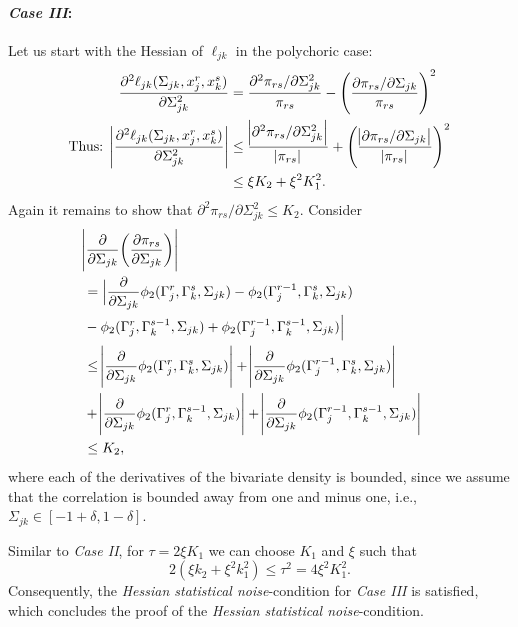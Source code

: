 \begin{condition}
    \paragraph{\textit{Case III}:} Let us start with the Hessian of \(\ell_{jk}\) in the polychoric case:
    \begin{equation}\label{hessian_case3}
        \begin{split}
            \frac{\partial^2 \ell_{jk}(\Sigma_{jk}, x_j^r,x_k^s)}{\partial \Sigma_{jk}^{2}} &= \frac{\partial^2 \pi_{rs}/\partial \Sigma_{jk}^{2}}{\pi_{rs}} - \Bigg(\frac{\partial \pi_{rs}/\partial \Sigma_{jk}}{\pi_{rs}}\Bigg)^2 \\
            \text{Thus: } \abs{\frac{\partial^2 \ell_{jk}(\Sigma_{jk}, x_j^r,x_k^s)}{\partial \Sigma_{jk}^{2}}} &\leq \frac{\abs{\partial^2 \pi_{rs}/\partial \Sigma_{jk}^{2}}}{\abs{\pi_{rs}}} + \Bigg(\frac{\abs{\partial \pi_{rs}/\partial \Sigma_{jk}}}{\abs{\pi_{rs}}} \Bigg)^2 \\
            &\leq \xi K_2 + \xi^2K_1^2.
        \end{split}
    \end{equation}
    Again it remains to show that $\partial^2 \pi_{rs}/\partial \Sigma_{jk}^{2} \leq K_2$. Consider
    \begin{equation*}
        \begin{split}
            \lefteqn{\abs{\frac{\partial}{\partial \Sigma_{jk}}\bigg(\frac{\partial \pi_{rs}}{\partial \Sigma_{jk}}\bigg)}} \\
            &= \Big\lvert \frac{\partial}{\partial \Sigma_{jk}}\phi_2({\Gamma}_j^r, {\Gamma}_k^s, \Sigma_{jk}) - \phi_2({\Gamma}_j^{r-1}, {\Gamma}_k^s, \Sigma_{jk}) \\
            &- \phi_2({\Gamma}_j^r, {\Gamma}_k^{s-1}, \Sigma_{jk}) + \phi_2({\Gamma}_j^{r-1}, {\Gamma}_k^{s-1}, \Sigma_{jk})\Big\rvert \\
            &\leq \abs{\frac{\partial}{\partial \Sigma_{jk}}\phi_2({\Gamma}_j^r, {\Gamma}_k^s, \Sigma_{jk})} + \abs{\frac{\partial}{\partial \Sigma_{jk}}\phi_2({\Gamma}_j^{r-1}, {\Gamma}_k^s, \Sigma_{jk})} \\
            &+ \abs{\frac{\partial}{\partial \Sigma_{jk}}\phi_2({\Gamma}_j^r, {\Gamma}_k^{s-1}, \Sigma_{jk})} + \abs{\frac{\partial}{\partial \Sigma_{jk}}\phi_2({\Gamma}_j^{r-1}, {\Gamma}_k^{s-1}, \Sigma_{jk})} \\
            &\leq K_2,
        \end{split}
    \end{equation*}
    where each of the derivatives of the bivariate density is bounded, since we assume that the correlation is bounded away from one and minus one, i.e., \(\Sigma_{jk} \in [-1 + \delta, 1 - \delta]\).

    Similar to \textit{Case II}, for $\tau = 2\xi K_1$ we can choose $K_1$ and $\xi$ such that \[2(\xi k_2 + \xi^2 k_1^2) \leq \tau^2 = 4\xi^2 K_1^2.\]
    Consequently, the \textit{Hessian statistical noise}-condition for \textit{Case III} is satisfied, which concludes the proof of the \textit{Hessian statistical noise}-condition.
\end{condition}

